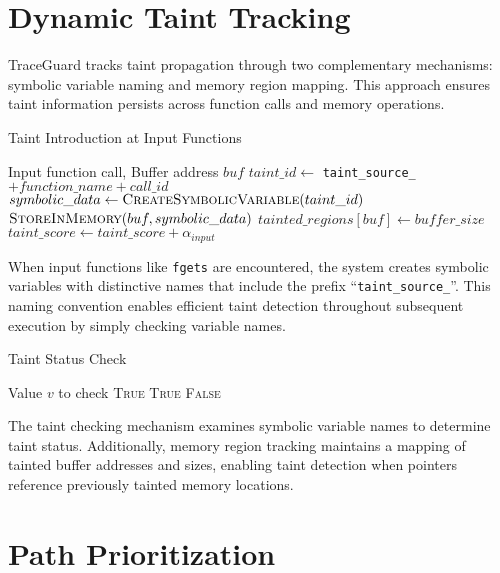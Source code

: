 \section{Dynamic Taint Tracking}

TraceGuard tracks taint propagation through two complementary mechanisms: symbolic variable naming and memory region mapping. This approach ensures taint information persists across function calls and memory operations.

\begin{algorithm}
\caption{Taint Introduction at Input Functions}
\begin{algorithmic}[1]
\Require Input function call, Buffer address $buf$
\State $taint\_id \gets$ \texttt{taint\_source\_} $+ function\_name + call\_id$
\State $symbolic\_data \gets \textsc{CreateSymbolicVariable}(taint\_id)$
\State $\textsc{StoreInMemory}(buf, symbolic\_data)$
\State $tainted\_regions[buf] \gets buffer\_size$
\State $taint\_score \gets taint\_score + \alpha_{input}$
\end{algorithmic}
\end{algorithm}

When input functions like \texttt{fgets} are encountered, the system creates symbolic variables with distinctive names that include the prefix ``\texttt{taint\_source\_}''. This naming convention enables efficient taint detection throughout subsequent execution by simply checking variable names.

\begin{algorithm}
\caption{Taint Status Check}
\begin{algorithmic}[1]
\Require Value $v$ to check
            \State \Return \textsc{True}
        \EndIf
    \EndFor
\EndIf
{}
        \State \Return \textsc{True}
    \EndIf
\EndIf
\State \Return \textsc{False}
\end{algorithmic}
\end{algorithm}

The taint checking mechanism examines symbolic variable names to determine taint status. Additionally, memory region tracking maintains a mapping of tainted buffer addresses and sizes, enabling taint detection when pointers reference previously tainted memory locations.

\section{Path Prioritization}


